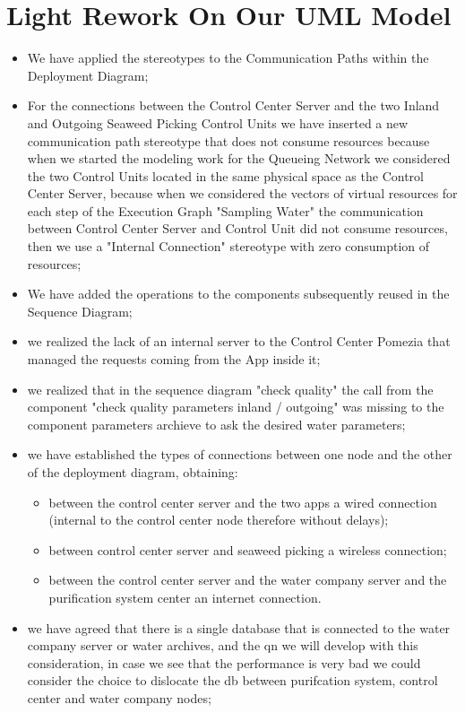 \newpage \chapter{\textbf{Light Rework On Our UML Model}}

\begin{itemize}
\item We have applied the stereotypes to the Communication Paths 			within the Deployment Diagram;
\item For the connections between the Control Center Server and the 		two Inland and Outgoing Seaweed Picking Control Units we 				have inserted a new communication path stereotype that does 			not consume resources because when we started the modeling 				work for the Queueing Network we considered the two Control 			Units located in the same physical space as the Control 				Center Server, because when we considered the vectors of 				virtual resources for each step of the Execution Graph 					"Sampling Water" the communication between Control Center 				Server and Control Unit did not consume resources, then we 				use a "Internal Connection" stereotype with zero consumption of 		resources;
\item We have added the operations to the components subsequently 			reused in the Sequence Diagram;
\item we realized the lack of an internal server to the Control Center 	Pomezia that managed the requests coming from the App inside it;
\item we realized that in the sequence diagram "check quality" the 			call from the component "check quality parameters inland /				outgoing" was missing to the component parameters archieve to ask 		the desired water parameters;
\item we have established the types of connections between one node 		and the other of the deployment diagram, obtaining:
	\begin{itemize}
	\item between the control center server and the two apps a wired 			connection (internal to the control center node therefore 				without delays);
	\item between control center server and seaweed picking a wireless 		connection;
	\item between the control center server and the water company 				server and the purification system center an internet 					connection.
	\end{itemize}
\item we have agreed that there is a single database that is connected 	to the water company server or water archives, and the qn we will 		develop with this consideration, in case we see that the 				performance is very bad we could consider the choice to dislocate 		the db between purifcation system, control center and water 			company nodes;

\end{itemize}
